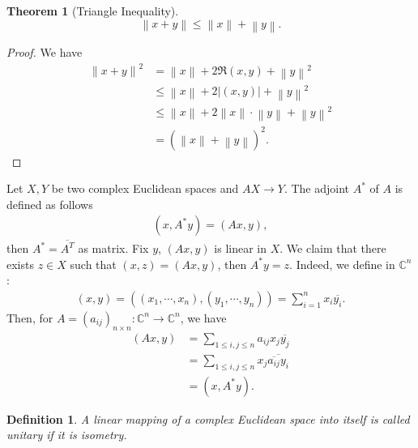 \documentclass[11pt]{book}
\newtheorem{definition}{Definition}[chapter]
\newtheorem{theorem}{Theorem}[chapter]
\theoremstyle{definition}
\numberwithin{equation}{chapter}
\begin{document}
\medskip

\begin{theorem}[Triangle Inequality]
$$\left\|x+y\right\| \leq \left\|x\right\| + \left\|y\right\|.$$
\end{theorem}
\begin{proof}
We have
\begin{align*}
    \left\|x+y\right\|^2 & = \left\|x\right\| + 2 \Re(x,y) + \left\|y\right\|^2 \\
    & \leq \left\|x\right\| + 2\left|(x,y)\right| + \left\|y\right\|^2 \\
    & \leq \left\|x\right\| + 2 \left\|x\right\| \cdot \left\|y\right\| + \left\|y\right\|^2 \\
    & = (\left\|x\right\| + \left\|y\right\|)^2.
\end{align*}
\end{proof}

\medskip

Let $X, Y$ be two complex Euclidean spaces and $AX\to Y$. The adjoint $A^*$ of $A$ is defined as follows 
\begin{align*}
    (x, A^* y) = (Ax, y),
\end{align*}
then $A^* = \overline{A^T}$ as matrix. Fix $y$, $(Ax, y)$ is linear in $X$. We claim that there exists $z\in X$ such that $(x,z) = (Ax, y)$, then $A^* y = z$. Indeed, we define in $\mathbb{C}^n$:
\begin{align*}
    (x,y) = \left((x_1,\cdots,x_n), (y_1,\cdots,y_n)\right) = \sum^n_{i=1}x_i \overline{y_i}.
\end{align*}
Then, for $A = (a_{ij})_{n\times n}:\mathbb{C}^n \to \mathbb{C}^n$, we have
\begin{align*}
    (Ax, y) & = \sum_{1\leq i,j\leq n}a_{ij} x_j \overline{y_j} \\
    & = \sum_{1\leq i,j\leq n} x_j \overline{\overline{a_{ij}} y_i} \\
    & = (x, A^* y).
\end{align*}

\medskip

\begin{definition}
A linear mapping of a complex Euclidean space into itself is called unitary if it is isometry.
\end{definition}

\medskip
\end{document}
